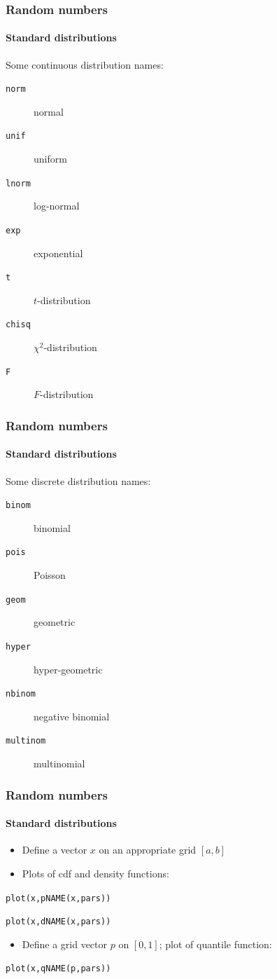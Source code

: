 \documentclass[xcolor={svgnames},10pt,
handout
]{beamer}
\begin{document}
\begin{frame}
\frametitle{Random numbers}
\framesubtitle{Standard distributions}
Some continuous distribution names:
\begin{description}
\item[\texttt{norm}] normal
\item[\texttt{unif}] uniform
\item[\texttt{lnorm}] log-normal
\item[\texttt{exp}] exponential
\item[\texttt{t}] $t$-distribution
\item[\texttt{chisq}] $\chi ^{2}$-distribution
\item[\texttt{F}] $F$-distribution
\end{description}
\end{frame}


\begin{frame}
\frametitle{Random numbers}
\framesubtitle{Standard distributions}
Some discrete distribution names:
\begin{description}
\item[\texttt{binom}] binomial
\item[\texttt{pois}] Poisson
\item[\texttt{geom}] geometric
\item[\texttt{hyper}] hyper-geometric
\item[\texttt{nbinom}] negative binomial
\item[\texttt{multinom}] multinomial
\end{description}
\end{frame}


\begin{frame}
\frametitle{Random numbers}
\framesubtitle{Standard distributions}
\begin{itemize}
\item Define a vector $x$ on an appropriate grid $[a,b]$
\item Plots of cdf and density functions:
\end{itemize}
\begin{center}
\texttt{plot(x,pNAME(x,pars))}

\texttt{plot(x,dNAME(x,pars))}
\end{center}
\begin{itemize}
\item Define a grid vector $p$ on $[0,1]$; plot of quantile function:
\end{itemize}
\begin{center}
\texttt{plot(x,qNAME(p,pars))}
\end{center}
\end{frame}
\end{document}
